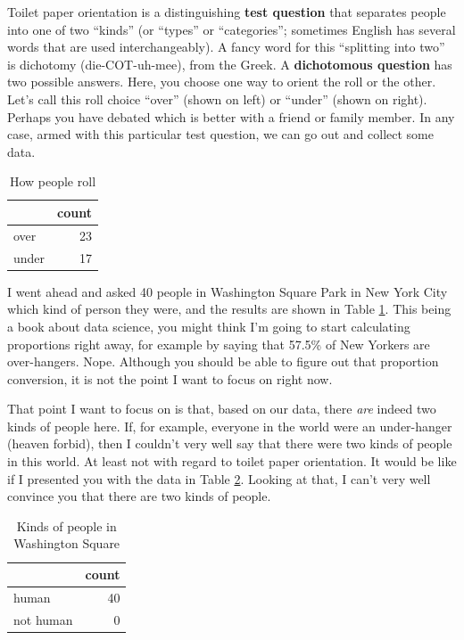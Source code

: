 \documentclass[
  openany]{book}
\begin{document}
Toilet paper orientation is a distinguishing \textbf{test question} that separates people into one of two ``kinds'' (or ``types'' or ``categories''; sometimes English has several words that are used interchangeably). A fancy word for this ``splitting into two'' is dichotomy (die-COT-uh-mee), from the Greek. A \textbf{dichotomous question} has two possible answers. Here, you choose one way to orient the roll or the other. Let's call this roll choice ``over'' (shown on left) or ``under'' (shown on right). Perhaps you have debated which is better with a friend or family member. In any case, armed with this particular test question, we can go out and collect some data.

\begin{table}[!h]

\caption{\label{tab:tp-table}How people roll}
\centering
\begin{tabular}[t]{lr}
\toprule
 & count\\
\midrule
over & 23\\
under & 17\\
\bottomrule
\end{tabular}
\end{table}

I went ahead and asked 40 people in Washington Square Park in New York City which kind of person they were, and the results are shown in Table \ref{tab:tp-table}. This being a book about data science, you might think I'm going to start calculating proportions right away, for example by saying that 57.5\% of New Yorkers are over-hangers.
Nope. Although you should be able to figure out that proportion conversion, it is not the point I want to focus on right now.

That point I want to focus on is that, based on our data, there \emph{are} indeed two kinds of people here. If, for example, everyone in the world were an under-hanger (heaven forbid), then I couldn't very well say that there were two kinds of people in this world. At least not with regard to toilet paper orientation. It would be like if I presented you with the data in Table \ref{tab:dumb-table}. Looking at that, I can't very well convince you that there are two kinds of people.

\begin{table}[!h]

\caption{\label{tab:dumb-table}Kinds of people in Washington Square}
\centering
\begin{tabular}[t]{lr}
\toprule
  & count\\
\midrule
human & 40\\
not human & 0\\
\bottomrule
\end{tabular}
\end{table}
\end{document}
